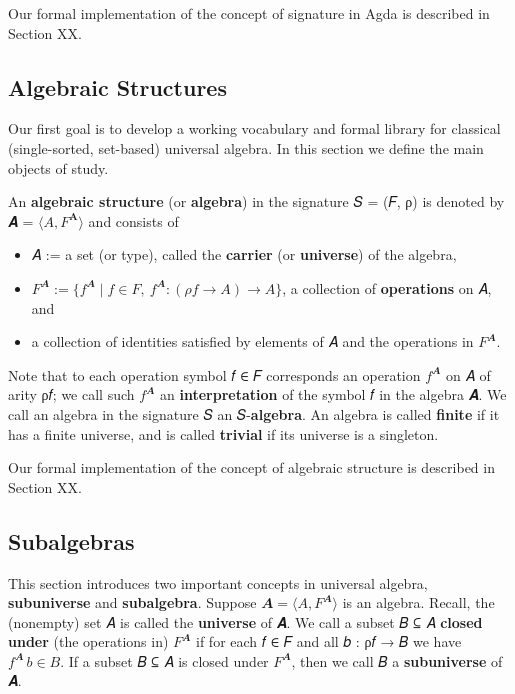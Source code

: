 \documentclass[sigplan,screen]{acmart}
\begin{document}
Our formal implementation of the concept of signature in Agda is described in Section XX.

\subsection{Algebraic Structures}\label{algebraic-structures}
Our first goal is to develop a working vocabulary and formal library for classical (single-sorted, set-based) universal algebra. In this section we define the main objects of study.


An \textbf{algebraic structure} (or \textbf{algebra}) in the signature 𝑆 = (𝐹, ρ) is denoted by 𝑨 = \( ⟨A, F^{\mathbf A}⟩\) and consists of

\begin{itemize}
\item 𝐴 := a set (or type), called the \textbf{carrier} (or \textbf{universe}) of the algebra,
\item \(F^{𝑨} := \{ f^{𝑨} ∣ f ∈ F, \ f^{𝑨} : (ρ𝑓 → A) → A \}\), a collection of \textbf{operations} on 𝐴, and
\item a collection of identities satisfied by elements of 𝐴 and the operations in \(F^{𝑨}\).
\end{itemize}

Note that to each operation symbol 𝑓 ∈ 𝐹 corresponds an operation \(f^{𝑨}\) on 𝐴 of arity ρ𝑓; we call such \(f^{𝑨}\) an
\textbf{interpretation} of the symbol 𝑓 in the algebra 𝑨. We call an algebra in the signature 𝑆 an 𝑆-\textbf{algebra}. An algebra is called \textbf{finite} if it has a finite universe, and is called \textbf{trivial} if its universe is a singleton.

Our formal implementation of the concept of algebraic structure is described in Section XX.

\subsection{Subalgebras}\label{subalgebras}
This section introduces two important concepts in universal algebra, \textbf{subuniverse} and \textbf{subalgebra}. Suppose \(𝑨 = ⟨A, F^{𝑨}⟩\) is an algebra. Recall, the (nonempty) set 𝐴 is called the \textbf{universe} of 𝑨. We call a subset 𝐵 ⊆ 𝐴 \textbf{closed under} (the operations in) \(F^{𝑨}\) if for each 𝑓 ∈ 𝐹 and all 𝑏 : ρ𝑓 → 𝐵 we have \(f^{𝑨} \, b ∈ B\). If a subset 𝐵 ⊆ 𝐴 is closed under \(F^{𝑨}\), then we call 𝐵 a \textbf{subuniverse} of 𝑨.
\end{document}

